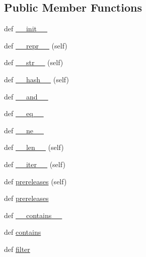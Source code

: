 \subsection*{Public Member Functions}
\begin{DoxyCompactItemize}
\item 
def \hyperlink{classpip_1_1__vendor_1_1packaging_1_1specifiers_1_1SpecifierSet_afcc0d1fb0ce0b11c7d3498b9dc496acc}{\+\_\+\+\_\+init\+\_\+\+\_\+}
\item 
def \hyperlink{classpip_1_1__vendor_1_1packaging_1_1specifiers_1_1SpecifierSet_a3593508c9af64b8f383b5c80b5172bcf}{\+\_\+\+\_\+repr\+\_\+\+\_\+} (self)
\item 
def \hyperlink{classpip_1_1__vendor_1_1packaging_1_1specifiers_1_1SpecifierSet_a88d34725126279dda38e6ede3188054b}{\+\_\+\+\_\+str\+\_\+\+\_\+} (self)
\item 
def \hyperlink{classpip_1_1__vendor_1_1packaging_1_1specifiers_1_1SpecifierSet_ae37cde9b0c04e99fca8da213ddf777f4}{\+\_\+\+\_\+hash\+\_\+\+\_\+} (self)
\item 
def \hyperlink{classpip_1_1__vendor_1_1packaging_1_1specifiers_1_1SpecifierSet_a9df9cbcabc86b4806a56c991bb9dcead}{\+\_\+\+\_\+and\+\_\+\+\_\+}
\item 
def \hyperlink{classpip_1_1__vendor_1_1packaging_1_1specifiers_1_1SpecifierSet_aac4533bef6166ad796f2061078554361}{\+\_\+\+\_\+eq\+\_\+\+\_\+}
\item 
def \hyperlink{classpip_1_1__vendor_1_1packaging_1_1specifiers_1_1SpecifierSet_a2f44794ab38c0d47feec62773ace58ed}{\+\_\+\+\_\+ne\+\_\+\+\_\+}
\item 
def \hyperlink{classpip_1_1__vendor_1_1packaging_1_1specifiers_1_1SpecifierSet_a467624e23a5fbd46e69bc914b8f757b8}{\+\_\+\+\_\+len\+\_\+\+\_\+} (self)
\item 
def \hyperlink{classpip_1_1__vendor_1_1packaging_1_1specifiers_1_1SpecifierSet_a42ba51a6be9030035db2c386e7f9f71b}{\+\_\+\+\_\+iter\+\_\+\+\_\+} (self)
\item 
def \hyperlink{classpip_1_1__vendor_1_1packaging_1_1specifiers_1_1SpecifierSet_a64a8311d1efa785d3c03baf9b8f055a6}{prereleases} (self)
\item 
def \hyperlink{classpip_1_1__vendor_1_1packaging_1_1specifiers_1_1SpecifierSet_addbf3fb757cf65b2826638d44f20d21f}{prereleases}
\item 
def \hyperlink{classpip_1_1__vendor_1_1packaging_1_1specifiers_1_1SpecifierSet_a4133d09a94245947d81c0eb35793824b}{\+\_\+\+\_\+contains\+\_\+\+\_\+}
\item 
def \hyperlink{classpip_1_1__vendor_1_1packaging_1_1specifiers_1_1SpecifierSet_abc5f943945c324638cd4d3b2ba226096}{contains}
\item 
def \hyperlink{classpip_1_1__vendor_1_1packaging_1_1specifiers_1_1SpecifierSet_ac883b0133e174329e9c05ea68e7390f4}{filter}
\end{DoxyCompactItemize}
